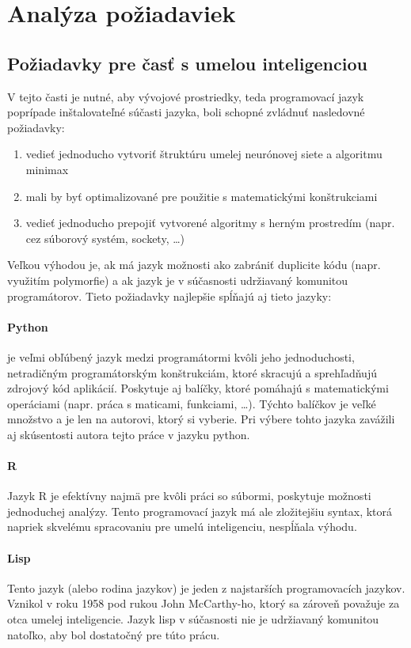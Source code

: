\section{Analýza požiadaviek}\label{sec:requirements}

\subsection{Požiadavky pre časť s umelou inteligenciou}\label{subsec:requirements-ai}

V tejto časti je nutné, aby vývojové prostriedky, teda programovací jazyk poprípade inštalovateľné súčasti jazyka, boli
schopné zvládnuť nasledovné požiadavky:
\begin{enumerate}
    \item vedieť jednoducho vytvoriť štruktúru umelej neurónovej siete a algoritmu minimax
    \item mali by byť optimalizované pre použitie s matematickými konštrukciami
    \item vedieť jednoducho prepojiť vytvorené algoritmy s herným prostredím (napr. cez súborový systém, sockety, \ldots)
\end{enumerate}
Veľkou výhodou je, ak má jazyk možnosti ako zabrániť duplicite kódu (napr. využitím polymorfie) a ak jazyk je v
súčasnosti udržiavaný komunitou programátorov.
Tieto požiadavky najlepšie spĺňajú\cite{best_ai_languages} aj tieto jazyky:

\paragraph{Python} je veľmi obľúbený jazyk medzi programátormi kvôli jeho jednoduchosti, netradičným programátorským
konštrukciám, ktoré skracujú a sprehľadňujú zdrojový kód aplikácií.
Poskytuje aj balíčky, ktoré pomáhajú s matematickými operáciami (napr. práca s maticami, funkciami, \dots).
Týchto balíčkov je veľké množstvo a je len na autorovi, ktorý si vyberie.
Pri výbere tohto jazyka zavážili aj skúsentosti autora tejto práce v jazyku python.

\paragraph{R}
Jazyk R je efektívny najmä pre kvôli práci so súbormi, poskytuje možnosti jednoduchej analýzy.
Tento programovací jazyk má ale zložitejšiu syntax, ktorá napriek skvelému spracovaniu pre umelú inteligenciu,
nespĺňala výhodu.

\paragraph{Lisp}
Tento jazyk (alebo rodina jazykov) je jeden z najstarších programovacích jazykov.
Vznikol v roku 1958 pod rukou John McCarthy-ho, ktorý sa zároveň považuje za otca umelej
inteligencie.\cite{father_of_ai}
Jazyk lisp v súčasnosti nie je udržiavaný komunitou natoľko, aby bol dostatočný pre túto prácu.

